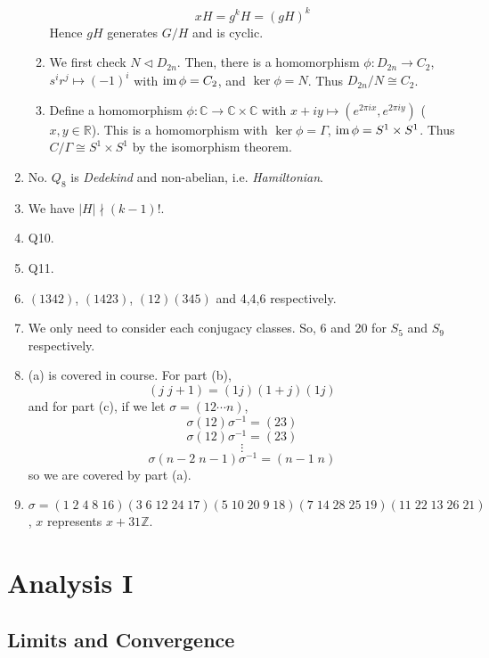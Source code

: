 \documentclass[10pt, a4paper, twoside]{report}
\begin{document}
\begin{enumerate}[{1.}]
\begin{enumerate}[{(a)}]
        \[xH=g^kH=(gH)^k\]
        Hence \(gH\) generates \(G/H\) and is cyclic.
        \item We first check \(N\lhd D_{2n}\). Then, there is a homomorphism \(\phi:D_{2n}\to C_2\), \(s^ir^j\mapsto (-1)^i\) with \(\operatorname{im}\phi=C_2\), and \(\ker\phi=N\). Thus \(D_{2n}/N\cong C_2\).
        \item Define a homomorphism \(\phi:\mathbb{C}\to\mathbb{C}\times\mathbb{C}\) with \(x+iy\mapsto (e^{2\pi i x},e^{2\pi i y})\) (\(x,y\in\mathbb{R}\)). This is a homomorphism with \(\ker\phi=\Gamma\), \(\operatorname{im}\phi=S^1\times S^1\). Thus \(C/\Gamma\cong S^1\times S^1\) by the isomorphism theorem.
    \end{enumerate}
    \item No. \(Q_8\) is \emph{Dedekind} and non-abelian, i.e. \emph{Hamiltonian}. 
    \item We have \(|H|\nmid (k-1)!\).
    \item Q10.
    \item Q11.
    \item \((1342)\), \((1423)\), \((12)(345)\) and 4,4,6 respectively.
    \item We only need to consider each conjugacy classes. So, 6 and 20 for \(S_5\) and \(S_9\) respectively.
    \item (a) is covered in course. For part (b), 
    \[(j \; j+1)=(1j)(1+j)(1j)\]
    and for part (c), if we let \(\sigma=(12\cdots n)\), 
    \[\sigma(12)\sigma^{-1}=(23)\]
    \[\sigma(12)\sigma^{-1}=(23)\]
    \[\vdots\]
    \[\sigma(n-2\;n-1)\sigma^{-1}=(n-1\;n)\]
    so we are covered by part (a).
    \item \(\sigma=(1\;2\;4\;8\;16)(3\;6\;12\;24\;17)(5\;10\;20\;9\;18)(7\;14\;28\;25\;19)(11\;22\;13\;26\;21)\), \(x\) represents \(x+31\mathbb{Z}\).
\end{enumerate}
\chapter{Analysis I}
\section{Limits and Convergence}
\end{document}
